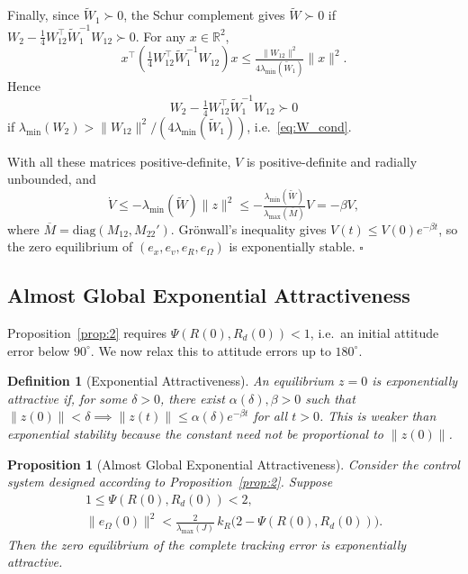 \documentclass[11pt]{article}
\newtheorem{proposition}{Proposition}
\newtheorem{definition}{Definition}
\theoremstyle{remark}
\newcommand{\R}{\mathbb{R}}
\newcommand{\diag}{\mathrm{diag}}
\newcommand{\lmin}{\lambda_{\min}}
\newcommand{\lmax}{\lambda_{\max}}
\begin{document}
Finally, since $\widetilde W_1 \succ 0$, the Schur complement gives $\widetilde W \succ 0$ if $W_2 - \tfrac{1}{4}W_{12}^\top\widetilde W_1^{-1}W_{12} \succ 0$. For any $x \in \R^2$,
\[
x^\top\!\left(\tfrac{1}{4}W_{12}^\top\widetilde W_1^{-1}W_{12}\right)x \le \tfrac{\|W_{12}\|^2}{4\lmin(\widetilde W_1)}\|x\|^2.
\]
Hence
\begin{equation}
W_2 - \tfrac{1}{4}W_{12}^\top\widetilde W_1^{-1}W_{12} \succ 0
\label{eq:W_1_tilde_bound}
\end{equation}
if $\lmin(W_2) > \|W_{12}\|^2/(4\lmin(\widetilde W_1))$, i.e.\ \eqref{eq:W_cond}.

With all these matrices positive-definite, $V$ is positive-definite and radially unbounded, and
\[
\dot V \le -\lmin(\widetilde W)\|z\|^2 \le -\tfrac{\lmin(\widetilde W)}{\lmax(\overline M)}V = -\beta V,
\]
where $\overline M = \diag(M_{12}, M_{22}')$. Gr\"onwall's inequality gives $V(t) \le V(0)e^{-\beta t}$, so the zero equilibrium of $(e_x,e_v,e_R,e_\Omega)$ is exponentially stable. $\square$

\subsection{Almost Global Exponential Attractiveness}
\label{app:prop3}
\label{sec:prop3}

Proposition~\ref{prop:2} requires $\Psi(R(0),R_d(0)) < 1$, i.e.\ an initial attitude error below $90^\circ$. We now relax this to attitude errors up to $180^\circ$.

\begin{definition}[Exponential Attractiveness]
\label{def:exp_attractiveness}
An equilibrium $z=0$ is \emph{exponentially attractive} if, for some $\delta>0$, there exist $\alpha(\delta), \beta > 0$ such that $\|z(0)\| < \delta \implies \|z(t)\| \le \alpha(\delta)e^{-\beta t}$ for all $t>0$. This is weaker than exponential stability because the constant need not be proportional to $\|z(0)\|$.
\end{definition}

\begin{proposition}[Almost Global Exponential Attractiveness]
\label{prop:3}
Consider the control system designed according to Proposition~\ref{prop:2}. Suppose
\begin{align}
1 \le \Psi(R(0),R_d(0)) < 2, \label{eq:prop3_ic1}\\
\|e_\Omega(0)\|^2 < \tfrac{2}{\lmax(J)}\,k_R\bigl(2-\Psi(R(0),R_d(0))\bigr). \label{eq:prop3_ic2}
\end{align}
Then the zero equilibrium of the complete tracking error is exponentially attractive.
\end{proposition}
\end{document}
